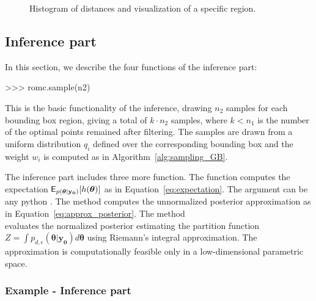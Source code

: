 \documentclass[article]{jss}
\newcommand{\thetab}{\boldsymbol{\theta}}
\newcommand{\data}{\mathbf{y_0}}
\begin{document}
\begin{figure}[ht]
  \begin{center}
    
    
  \end{center}
  \caption[Histogram of distances at the one-dimensional example.]{Histogram of
    distances and visualization of a specific region.}
  \label{fig:running_example_romc_inference}
\end{figure}

\subsection{Inference part}
\label{subsec:inference}

In this section, we describe the four functions of the inference part:

\begin{Code}
>>> romc.sample(n2)
\end{Code}

\noindent
This is the basic functionality of the inference, drawing \(n_2\)
samples for each bounding box region, giving a total of
\(k \cdot n_2\) samples, where \(k < n_1\) is the number of the
optimal points remained after filtering. The samples are drawn from a
uniform distribution \(q_i\) defined over the corresponding bounding
box and the weight \(w_i\) is computed as in
Algorithm~\ref{alg:sampling_GB}.

\noindent
The inference part includes three more function. The function
 computes the expectation
\(\E_{p(\thetab|\data)}[h(\thetab)]\) as in
Equation~\ref{eq:expectation}. The argument  can be any python
. The method  computes the unnormalized posterior
approximation as in Equation~\ref{eq:approx_posterior}. The method \\
 evaluates the
normalized posterior estimating the partition function
\(Z = \int p_{d,\epsilon}(\thetab|\data)d\thetab\) using Riemann's
integral approximation. The approximation is computationally feasible
only in a low-dimensional parametric space.

\subsubsection*{Example - Inference part}
\end{document}
